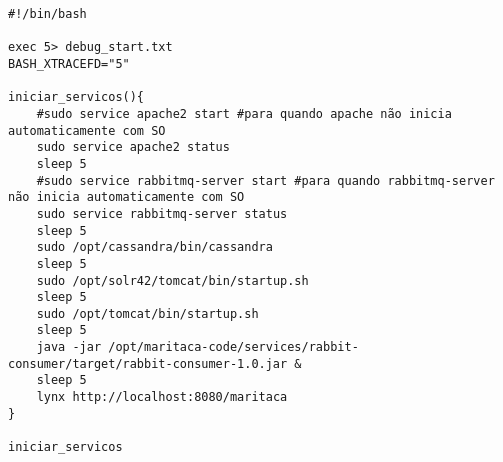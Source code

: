 \begin{lstlisting}[style=Bash]
#!/bin/bash

exec 5> debug_start.txt
BASH_XTRACEFD="5"

iniciar_servicos(){
	#sudo service apache2 start #para quando apache não inicia automaticamente com SO
	sudo service apache2 status
	sleep 5
	#sudo service rabbitmq-server start #para quando rabbitmq-server não inicia automaticamente com SO
	sudo service rabbitmq-server status
	sleep 5
	sudo /opt/cassandra/bin/cassandra
	sleep 5
	sudo /opt/solr42/tomcat/bin/startup.sh
	sleep 5 
	sudo /opt/tomcat/bin/startup.sh
	sleep 5
	java -jar /opt/maritaca-code/services/rabbit-consumer/target/rabbit-consumer-1.0.jar &
	sleep 5
	lynx http://localhost:8080/maritaca
}

iniciar_servicos
\end{lstlisting}
